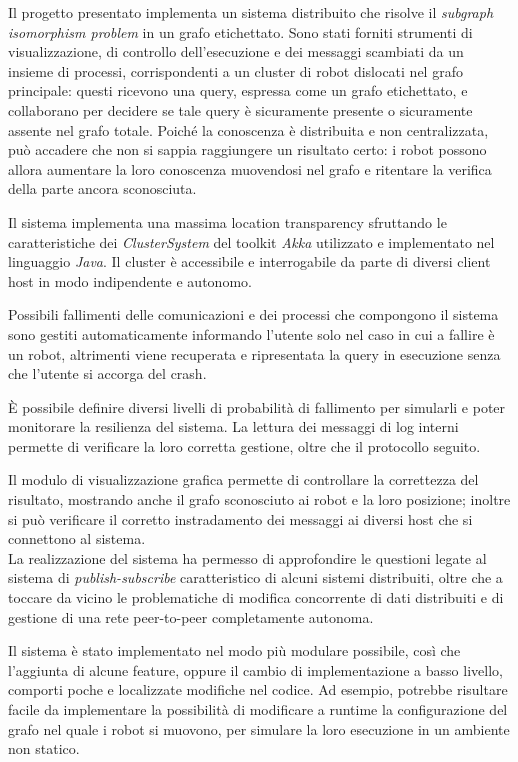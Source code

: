 Il progetto presentato implementa un sistema distribuito che risolve
il \emph{subgraph isomorphism problem} in un grafo etichettato.
Sono stati forniti strumenti di visualizzazione, di controllo
dell'esecuzione e dei messaggi scambiati da un insieme di processi,
corrispondenti a un cluster di robot dislocati nel grafo principale:
questi ricevono una query, espressa come un grafo etichettato,
e collaborano per decidere se tale query è sicuramente presente
o sicuramente assente nel grafo totale. Poiché la conoscenza è
distribuita e non centralizzata, può accadere che non si sappia
raggiungere un risultato certo: i robot possono allora aumentare
la loro conoscenza muovendosi nel grafo e ritentare la verifica
della parte ancora sconosciuta.

Il sistema implementa una massima location transparency sfruttando
le caratteristiche dei \emph{ClusterSystem} del toolkit \emph{Akka}
utilizzato e implementato nel linguaggio \emph{Java}.
Il cluster è accessibile e interrogabile da parte di diversi
client host in modo indipendente e autonomo.

Possibili fallimenti delle comunicazioni e dei processi che compongono
il sistema sono gestiti automaticamente informando l'utente
solo nel caso in cui a fallire è un robot, altrimenti viene recuperata
e ripresentata la query in esecuzione senza che l'utente si
accorga del crash.

\`E possibile definire diversi livelli di probabilità di fallimento
per simularli e poter monitorare la resilienza del sistema.
La lettura dei messaggi di log interni permette di verificare
la loro corretta gestione, oltre che il protocollo seguito.

Il modulo di visualizzazione grafica permette di controllare
la correttezza del risultato, mostrando anche il grafo sconosciuto
ai robot e la loro posizione; inoltre si può verificare il
corretto instradamento dei messaggi ai diversi host che si connettono
al sistema.\\

La realizzazione del sistema ha permesso di approfondire
le questioni legate al sistema di \emph{publish-subscribe}
caratteristico di alcuni sistemi distribuiti, oltre che a
toccare da vicino le problematiche di modifica concorrente
di dati distribuiti e di gestione di una rete peer-to-peer
completamente autonoma.

Il sistema è stato implementato nel modo più modulare possibile,
così che l'aggiunta di alcune feature, oppure il cambio di
implementazione a basso livello, comporti poche e localizzate
modifiche nel codice.
Ad esempio, potrebbe risultare facile da implementare la possibilità
di modificare a runtime la configurazione del grafo nel quale i
robot si muovono, per simulare la loro esecuzione in un
ambiente non statico.
